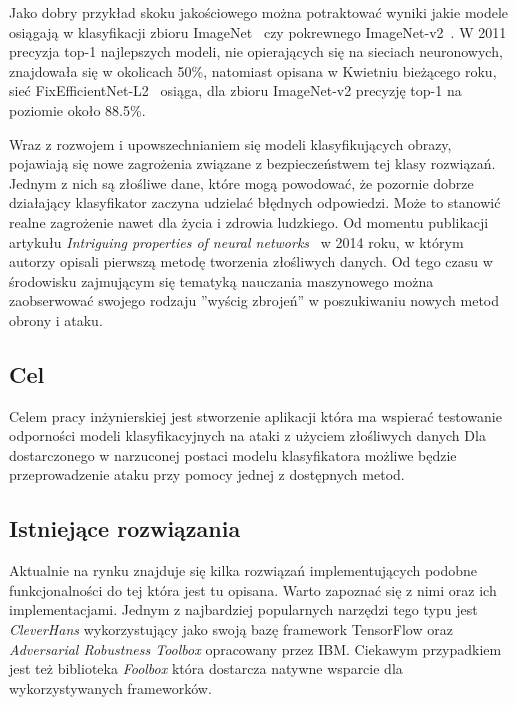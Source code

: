 \documentclass[
    left=2.5cm,         %
    right=2.5cm,        %
    top=2.5cm,          %
    bottom=3cm,         %
    bindingoffset=6mm,  %
    nohyphenation=false %
]{eiti/eiti-thesis}
\begin{document}
Jako dobry przykład skoku jakościowego można potraktować wyniki jakie modele osiągają w klasyfikacji zbioru ImageNet~\cite{ILSVRC15} czy pokrewnego ImageNet-v2~\cite{DBLP:journals/corr/abs-1902-10811}.
W 2011 precyzja top-1 najlepszych modeli, nie opierających się na sieciach neuronowych, znajdowała się w okolicach 50\%, natomiast
opisana w Kwietniu bieżącego roku, sieć FixEfficientNet-L2~\cite{Touvron2020FixingTT} osiąga, dla zbioru ImageNet-v2 precyzję top-1 na poziomie około 88.5\%.

Wraz z rozwojem i upowszechnianiem się modeli klasyfikujących obrazy,
pojawiają się nowe zagrożenia związane z bezpieczeństwem tej klasy rozwiązań.
Jednym z nich są złośliwe dane, które mogą powodować,
że pozornie dobrze działający klasyfikator zaczyna udzielać błędnych odpowiedzi.
Może to stanowić realne zagrożenie nawet dla życia i zdrowia ludzkiego.
Od momentu publikacji artykułu \textit{Intriguing properties of neural networks}~\cite{DBLP:journals/corr/SzegedyZSBEGF13} w 2014 roku,
w którym autorzy opisali pierwszą metodę tworzenia złośliwych danych.
Od tego czasu w środowisku zajmującym się tematyką nauczania maszynowego można zaobserwować swojego rodzaju
''wyścig zbrojeń'' w poszukiwaniu nowych metod obrony i ataku.

\subsection{Cel}
\label{sec:target}

Celem pracy inżynierskiej jest stworzenie aplikacji która ma wspierać testowanie
odporności modeli klasyfikacyjnych na ataki z użyciem złośliwych danych
Dla dostarczonego w narzuconej postaci modelu klasyfikatora możliwe będzie
przeprowadzenie ataku przy pomocy jednej z dostępnych metod.

\subsection{Istniejące rozwiązania}

Aktualnie na rynku znajduje się kilka rozwiązań implementujących podobne funkcjonalności
do tej która jest tu opisana. Warto zapoznać się z nimi oraz ich implementacjami.
Jednym z najbardziej popularnych narzędzi tego typu jest \textit{CleverHans}\cite{DBLP:journals/corr/GoodfellowPM16}
wykorzystujący jako swoją bazę framework TensorFlow oraz \textit{Adversarial Robustness Toolbox}\cite{DBLP:journals/corr/abs-1807-01069} opracowany przez IBM.
Ciekawym przypadkiem jest też biblioteka \textit{Foolbox}\cite{rauber2017foolbox} która dostarcza natywne wsparcie dla wykorzystywanych frameworków.
\end{document}
